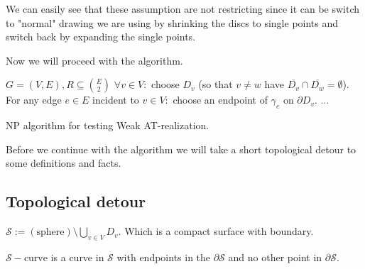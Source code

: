We can easily see that these assumption are not restricting since it can be switch to "normal" drawing we are using by shrinking the discs to single points and switch back by expanding the single points.

Now we will proceed with the algorithm.

\begin{algorithm}[!ht]
	\begin{algorithmic}[1]
		\Require $G = (V,E), R \subseteq \binom{E}{2}$
		\State $\forall v \in V:$ choose $D_v$ (so that $v \neq w$ have $\overline{D_v} \cap \overline{D_w} = \emptyset$).
		\State For any edge $e \in E$ incident to $v \in V:$ choose an endpoint of $\gamma_e$ on $\partial D_v$.
		\State \textcolor{Green}{$\dots$}
	\end{algorithmic}
	\caption{NP algorithm for testing Weak AT-realization.}
\end{algorithm}

Before we continue with the algorithm we will take a short topological detour to some definitions and facts.

\subsection{Topological detour}

\begin{defn}
	$\mathcal{S} := (\text{sphere}) \setminus \bigcup_{v \in V} D_v$. Which is a compact surface with boundary.
\end{defn}

\begin{defn}
	$\mathcal{S}-\text{curve}$ is a curve in $\mathcal{S}$ with endpoints in the $\partial \mathcal{S}$ and no other point in $\partial \mathcal{S}$.
\end{defn}